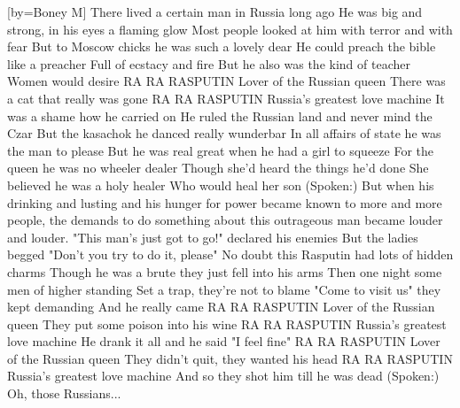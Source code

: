 [by={Boney M}]
\beginverse*\singlespacing
There lived a certain man in Russia long ago
He was big and strong, in his eyes a flaming glow
Most people looked at him with terror and with fear
But to Moscow chicks he was such a lovely dear
He could preach the bible like a preacher
Full of ecstacy and fire
But he also was the kind of teacher
Women would desire
\endverse
\beginchorus\singlespacing
  RA RA RASPUTIN
  Lover of the Russian queen
  There was a cat that really was gone
  RA RA RASPUTIN
  Russia's greatest love machine
  It was a shame how he carried on
\endchorus
\beginverse*\singlespacing
He ruled the Russian land and never mind the Czar
But the kasachok he danced really wunderbar
In all affairs of state he was the man to please
But he was real great when he had a girl to squeeze
For the queen he was no wheeler dealer
Though she'd heard the things he'd done
She believed he was a holy healer
Who would heal her son
\endverse
{}
\beginverse*\singlespacing
(Spoken:)
But when his drinking and lusting and his hunger
for power became known to more and more people,
the demands to do something about this outrageous
man became louder and louder.
\endverse
\beginverse*\singlespacing
"This man's just got to go!" declared his enemies
But the ladies begged "Don't you try to do it, please"
No doubt this Rasputin had lots of hidden charms
Though he was a brute they just fell into his arms
Then one night some men of higher standing
Set a trap, they're not to blame
"Come to visit us" they kept demanding
And he really came
\endverse
\beginchorus\singlespacing
RA RA RASPUTIN
Lover of the Russian queen
They put some poison into his wine
RA RA RASPUTIN
Russia's greatest love machine
He drank it all and he said "I feel fine"
\endchorus
\beginchorus\singlespacing
RA RA RASPUTIN
Lover of the Russian queen
They didn't quit, they wanted his head
RA RA RASPUTIN
Russia's greatest love machine
And so they shot him till he was dead
\endchorus
\beginverse*\singlespacing
(Spoken:) Oh, those Russians... 
\endverse
\endsong
